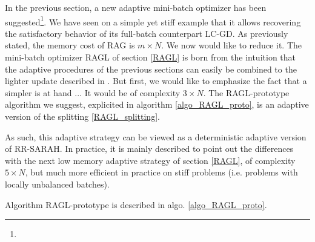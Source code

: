In the previous section, a new adaptive mini-batch optimizer has been suggested\footnote{}. 
We have seen on a simple yet stiff example that it allows recovering the satisfactory behavior of its full-batch counterpart LC-GD.
As previously stated, 
the memory cost of RAG is $m\times N$. 
We now would like to reduce it. %
The mini-batch optimizer RAGL%
of section \ref{RAGL} is born from the intuition
that the adaptive procedures of the previous sections can easily be combined to 
 the lighter update described in \cite{partI}.
 But first, we would like to emphasize the fact that a simpler is at hand ...  
 It would be of complexity $3\times N$.
The RAGL-prototype algorithm we suggest, explicited in algorithm \ref{algo_RAGL_proto}, is an adaptive version of the splitting \eqref{RAGL_splitting}. 
\begin{remark}
  \label{proto}
As such, this adaptive strategy can be viewed as a deterministic adaptive version of RR-SARAH. 
In practice, it is mainly described to point out the differences with the next low memory adaptive strategy of section \ref{RAGL}, of complexity $5\times N$, but much more
  efficient in practice on stiff problems (i.e. problems with locally unbalanced batches).
\end{remark}

Algorithm RAGL-prototype is described in algo. \ref{algo_RAGL_proto}. 


